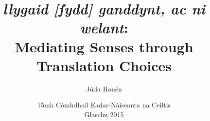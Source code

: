 \title
[Mediating Senses through Translation Choices]
{\emph{llygaid [ſydd] ganddynt, ac ni welant}:\\
Mediating Senses through\\Translation Choices}
\author[]{Júda Ronén}
\date{15mh Còmhdhail Eadar-Nàiseanta na Ceiltis\\Glaschu 2015}
\frame{\titlepage}
